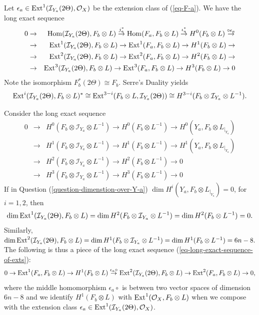 \documentclass[12pt]{amsart}
\numberwithin{equation}{subsection}
\theoremstyle{plain}
\theoremstyle{definition}
\newcommand{\RightArrowOf}[1]{\stackrel{#1}{\rightarrow}}
\newcommand{\StructureSheaf}[1]{{\mathcal O}_{#1}}
\newcommand{\restricted}[2]{#1_{\mid_{#2}}}
\newcommand{\Ext}{{\rm Ext}}
\newcommand{\Hom}{{\rm Hom}}
\newcommand{\Ideal}[1]{{\mathcal I}_{#1}}
\begin{document}
{Let $\epsilon_a\in \Ext^1(\Ideal{Y_a}(2\Theta),\StructureSheaf{X})$ be the extension class of (\ref{eq-F-a}). We have the long exact sequence
\begin{eqnarray}
\label{eq-long-exact-sequence-of-exts}
0&\rightarrow& \Hom(\Ideal{Y_a}(2\Theta),F_b\otimes L) \RightArrowOf{j_a^*}
\Hom(F_a,F_b\otimes L) \RightArrowOf{\iota_a^*}
H^0(F_b\otimes L) \RightArrowOf{\circ\epsilon_a}
\\
\nonumber
&\rightarrow & \Ext^1(\Ideal{Y_a}(2\Theta),F_b\otimes L)  \rightarrow 
\Ext^1(F_a,F_b\otimes L) \rightarrow H^1(F_b\otimes L) \rightarrow 
\\
\nonumber
&\rightarrow & \Ext^2(\Ideal{Y_a}(2\Theta),F_b\otimes L)  \rightarrow 
\Ext^2(F_a,F_b\otimes L) \rightarrow H^2(F_b\otimes L) \rightarrow 
\\
\nonumber
&\rightarrow & \Ext^3(\Ideal{Y_a}(2\Theta),F_b\otimes L)  \rightarrow 
\Ext^3(F_a,F_b\otimes L) \rightarrow H^3(F_b\otimes L) \rightarrow 0
\end{eqnarray}
Note the isomorphism $F_b^*(2\Theta) \cong F_b$. Serre's Duality yields
\[
\Ext^i(\Ideal{Y_a}(2\Theta),F_b\otimes L)^* \cong
\Ext^{3-i}(F_b\otimes L,\Ideal{Y_a}(2\Theta)) \cong
H^{3-i}(F_b\otimes\Ideal{Y_a}\otimes L^{-1}).
\]


Consider the long exact sequence
\begin{eqnarray*}
0&\rightarrow & H^0(F_b\otimes\Ideal{Y_a}\otimes L^{-1})\rightarrow H^0(F_b\otimes L^{-1})\rightarrow 
H^0(Y_a,F_b\otimes \restricted{L}{Y_a})
\\
&\rightarrow & 
H^1(F_b\otimes\Ideal{Y_a}\otimes L^{-1})\rightarrow H^1(F_b\otimes L^{-1})\rightarrow 
H^1(Y_a,F_b\otimes \restricted{L}{Y_a})
\\
&\rightarrow & 
H^2(F_b\otimes\Ideal{Y_a}\otimes L^{-1})\rightarrow H^2(F_b\otimes L^{-1})\rightarrow 
0
\\
&\rightarrow & 
H^3(F_b\otimes\Ideal{Y_a}\otimes L^{-1})\rightarrow H^3(F_b\otimes L^{-1})\rightarrow 
0
\end{eqnarray*}
If in Question (\ref{question-dimenstion-over-Y-a}) $\dim H^i(Y_a,F_b\otimes \restricted{L}{Y_a})=0$, for $i=1,2$,
then 
\[
\dim\Ext^1(\Ideal{Y_a}(2\Theta),F_b\otimes L)=\dim H^{2}(F_b\otimes\Ideal{Y_a}\otimes L^{-1})=
\dim H^2(F_b\otimes L^{-1})=0.
\] 
Similarly,
$\dim\Ext^2(\Ideal{Y_a}(2\Theta),F_b\otimes L)=\dim H^{1}(F_b\otimes\Ideal{Y_a}\otimes L^{-1})=
\dim H^1(F_b\otimes L^{-1})=6n-8.$ The following is thus a piece of the long exact sequence
(\ref{eq-long-exact-sequence-of-exts}):
\[
0\rightarrow \Ext^1(F_a,F_b\otimes L) \rightarrow H^1(F_b\otimes L) \RightArrowOf{\epsilon_a\circ}
 \Ext^2(\Ideal{Y_a}(2\Theta),F_b\otimes L)  \rightarrow 
\Ext^2(F_a,F_b\otimes L) \rightarrow 0,
\]
where the middle homomorphism $\epsilon_a\circ$ is between two vector spaces of dimension $6n-8$ and we identify $H^1(F_b\otimes L)$ with $\Ext^1(\StructureSheaf{X},F_b\otimes L)$ when we compose with the extension class $\epsilon_a\in\Ext^1(\Ideal{Y_a}(2\Theta),\StructureSheaf{X})$.


}
\end{document}
